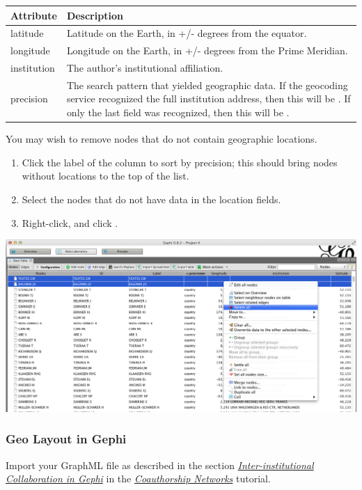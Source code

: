 \documentclass[letterpaper,10pt,english]{sphinxmanual}
\begin{document}
\begin{tabulary}{\linewidth}{|L|L|}
\hline
\textsf{\relax 
Attribute
} & \textsf{\relax 
Description
}\\
\hline
latitude
 & 
Latitude on the Earth, in +/- degrees from the equator.
\\

longitude
 & 
Longitude on the Earth, in +/- degrees from the Prime Meridian.
\\

institution
 & 
The  author's institutional affiliation.
\\

precision
 & 
The search pattern that yielded geographic data. If the geocoding service
recognized the full institution address, then this will be
. If only the last field was recognized, then this will be
.
\\
\hline\end{tabulary}


You may wish to remove nodes that do not contain geographic locations.
\begin{enumerate}
\item {} 
Click the label of the  column to sort by precision; this should bring
nodes without locations to the top of the list.

\item {} 
Select the nodes that do not have data in the location fields.

\item {} 
Right-click, and click .

\end{enumerate}

{\hfill\includegraphics{geo3.png}\hfill}


\subsubsection{Geo Layout in Gephi}
\label{tutorial.geonetworks:geo-layout-in-gephi}
Import your GraphML file as described in the section {\hyperref[tutorial.coauthors:coauthors-gephi]{\emph{Inter-institutional Collaboration in Gephi}}} in the
{\hyperref[tutorial.coauthors:coauthorship]{\emph{Coauthorship Networks}}} tutorial.
\end{document}

